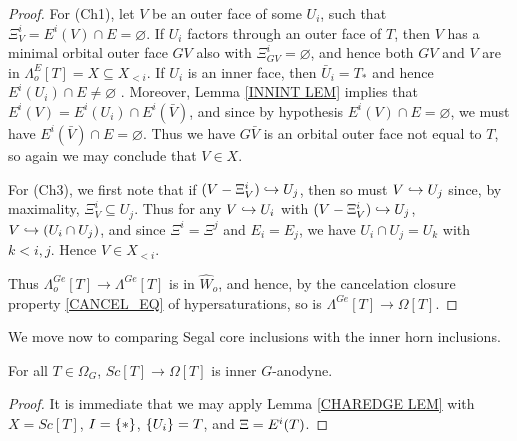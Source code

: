 \documentclass[a4paper,10pt,draft]{article}%
\begin{document}
\begin{proof}
      For (Ch1),      
      let $V$ be an outer face of some $U_i$, such that $\Xi^i_V = E^i(V) \cap E = \varnothing$.      
      If $U_i$ factors through an outer face of $T$,
      then $V$ has a minimal orbital outer face $G V$ also with $\Xi^i_{G V} = \varnothing$, %
      and hence both $G V$ and $V$ are in $\Lambda^E_o[T] = X \subseteq X_{< i}$.
      If $U_i$ is an inner face,
      then $\bar U_i = T_*$ and hence $E^i(U_i) \cap E \neq \varnothing$ . 
      Moreover, Lemma \ref{INNINT LEM} implies that $E^i(V) = E^i(U_i) \cap E^i(\bar V)$, and 
      since by hypothesis $E^i(V) \cap E = \varnothing$,
      we must have $E^i(\bar V) \cap E = \varnothing$.
      Thus we have $G \bar V$ is an orbital outer face not equal to $T$,
      so again we may conclude that $V \in X$.
      
      For (Ch3),
      we first note that if $(V - \Xi^i_V) \hookrightarrow U_j$, then so must $V \hookrightarrow U_j$
      since, by maximality, $\Xi^i_V \subseteq U_j$.
      Thus for any $V \hookrightarrow U_i$ with $(V - \Xi^i_V) \hookrightarrow U_j$,
      $V \hookrightarrow (U_i \cap U_j)$,
      and since $\Xi^i = \Xi^j$ and $E_i = E_j$, we have
      $U_i \cap U_j = U_k$ with $k < i,j$.
      Hence $V \in X_{< i}$.
      
      Thus $\Lambda^{G e}_o[T] \to \Lambda^{G e}[T]$ is in $\hat{W}_o$, and hence,
      by the cancelation closure property \eqref{CANCEL_EQ} of hypersaturations,
      so is $\Lambda^{G e}[T] \to \Omega[T]$.
\end{proof}

We move now to comparing Segal core inclusions with the inner horn inclusions.

\begin{proposition}
      \label{SC_IN_GHORN_PROP}
      For all $T \in \Omega_G$, $Sc[T] \to \Omega[T]$ is inner $G$-anodyne.
\end{proposition}
\begin{proof}
      It is immediate that we may apply Lemma \ref{CHAREDGE LEM}
      with $X = Sc[T]$, $I = \set{\**}$, $\left\{U_i\right\} = {T}$, and $\Xi = E^i(T)$.
\end{proof}
\end{document}
